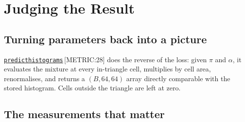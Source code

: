 \documentclass[11pt,a4paper]{report}
\newcommand{\srcbase}{vscode://file/Users/syellapa/Documents/Research/2026/ANSYS/Multi-ScalarPDF}
\newcommand{\dmdn}{dirichlet\string_mdn}
\newcommand{\srctag}[1]{{\footnotesize\textcolor{TagGray}{[#1]}}}
\newcommand{\Metric}[2]{\href{\srcbase/\dmdn/metrics.py:#1}{\texttt{#2}}\,\srctag{METRIC:#1}}
\renewcommand{\_}{\origtextunderscore\allowbreak}
\begin{document}
\chapter{Judging the Result}
\label{ch:eval}

\section{Turning parameters back into a picture}

\Metric{28}{predict\_histograms} does the reverse of the loss: given $\pi$ and $\alpha$, it
evaluates the mixture at every in-triangle cell, multiplies by cell area, renormalises, and
returns a $(B, 64, 64)$ array directly comparable with the stored histogram. Cells outside the
triangle are left at zero.

\section{The measurements that matter}
\end{document}
